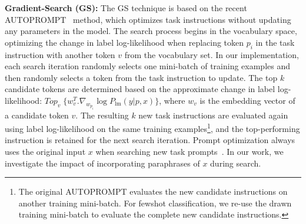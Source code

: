 \documentclass[11pt]{article}
\begin{document}
\textbf{Gradient-Search (GS):} 
The GS technique is based on the recent AUTOPROMPT~\cite{shin-etal-2020-autoprompt} method, which optimizes task instructions without updating any parameters in the model. The search process begins in the vocabulary space, optimizing the change in label log-likelihood when replacing token $p_{i}$ in the task instruction with another token $v$ from the vocabulary set. In our implementation, each search iteration randomly selects one mini-batch of training examples and then randomly selects a token from the task instruction to update. The top $k$ candidate tokens are determined based on the approximate change in label log-likelihood: $Top_v \; \{w^{T}_{v} . \nabla_{w_{p_i}} \log P_{\text{lm}}(y|p,x)\}$, where $w_v$ is the embedding vector of a candidate token $v$. The resulting $k$ new task instructions are evaluated again using label log-likelihood on the same training examples\footnote{The original AUTOPROMPT evaluates the new candidate instructions on another training mini-batch. For fewshot classification, we re-use the drawn training mini-batch to evaluate the complete new candidate instructions.}, and the top-performing instruction is retained for the next search iteration. Prompt optimization always uses the original input $x$ when searching new task prompts~\cite{shin-etal-2020-autoprompt, deng-etal-2022-rlprompt}. In our work, we investigate the impact of incorporating paraphrases of $x$ during search.

\end{document}

